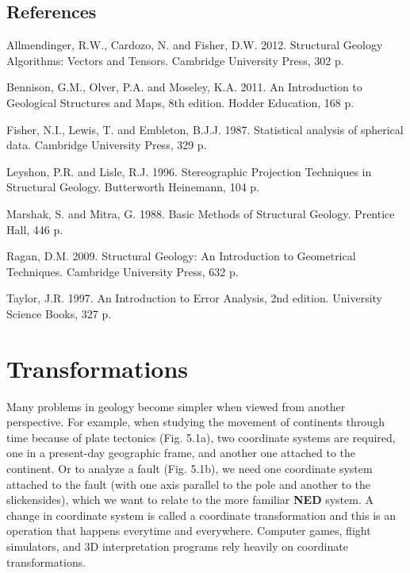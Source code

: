 \documentclass[a4paper , 12pt]{book}
\begin{document}
\section*{References}

Allmendinger, R.W., Cardozo, N. and Fisher, D.W. 2012. Structural Geology Algorithms: Vectors and Tensors. Cambridge University Press, 302 p.

Bennison, G.M., Olver, P.A. and Moseley, K.A. 2011. An Introduction to Geological Structures and Maps, 8th edition. Hodder Education, 168 p.

Fisher, N.I., Lewis, T. and Embleton, B.J.J. 1987. Statistical analysis of spherical data. Cambridge University Press, 329 p.

Leyshon, P.R. and Lisle, R.J. 1996. Stereographic Projection Techniques in Structural Geology. Butterworth Heinemann, 104 p.

Marshak, S. and Mitra, G. 1988. Basic Methods of Structural Geology. Prentice Hall, 446 p.

Ragan, D.M. 2009. Structural Geology: An Introduction to Geometrical Techniques. Cambridge University Press, 632 p.

Taylor, J.R. 1997. An Introduction to Error Analysis, 2nd edition. University Science Books, 327 p.

\chapter{Transformations}

Many problems in geology become simpler when viewed from another perspective. For example, when studying the movement of continents through time because of plate tectonics (Fig. 5.1a), two coordinate systems are required, one in a present-day geographic frame, and another one attached to the continent. Or to analyze a fault (Fig. 5.1b), we need one coordinate system attached to the fault (with one axis parallel to the pole and another to the slickensides), which we want to relate to the more familiar \textbf{NED} system. A change in coordinate system is called a coordinate transformation and this is an operation that happens everytime and everywhere. Computer games, flight simulators, and 3D interpretation programs rely heavily on coordinate transformations. 
\end{document}
